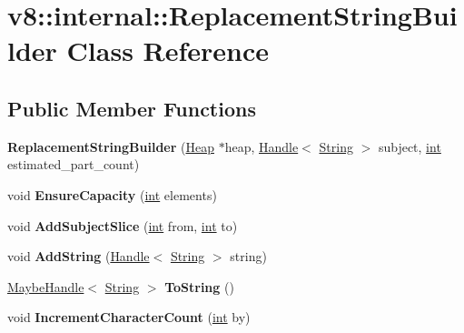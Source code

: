 \hypertarget{classv8_1_1internal_1_1ReplacementStringBuilder}{}\section{v8\+:\+:internal\+:\+:Replacement\+String\+Builder Class Reference}
\label{classv8_1_1internal_1_1ReplacementStringBuilder}
\subsection*{Public Member Functions}
\begin{DoxyCompactItemize}
\item 
\mbox{\label{classv8_1_1internal_1_1ReplacementStringBuilder_aa6ed9782d2325a8fdd46a6e15393eece}} 
{\bfseries Replacement\+String\+Builder} (\mbox{\hyperlink{classv8_1_1internal_1_1Heap}{Heap}} $\ast$heap, \mbox{\hyperlink{classv8_1_1internal_1_1Handle}{Handle}}$<$ \mbox{\hyperlink{classv8_1_1internal_1_1String}{String}} $>$ subject, \mbox{\hyperlink{classint}{int}} estimated\+\_\+part\+\_\+count)
\item 
\mbox{\label{classv8_1_1internal_1_1ReplacementStringBuilder_aa9308f62a984d9fd648403128ed0118f}} 
void {\bfseries Ensure\+Capacity} (\mbox{\hyperlink{classint}{int}} elements)
\item 
\mbox{\label{classv8_1_1internal_1_1ReplacementStringBuilder_ae8334fc56c55ed336a2a1d14b2fab3f5}} 
void {\bfseries Add\+Subject\+Slice} (\mbox{\hyperlink{classint}{int}} from, \mbox{\hyperlink{classint}{int}} to)
\item 
\mbox{\label{classv8_1_1internal_1_1ReplacementStringBuilder_a18e4204c090838012e9cca169c7302b6}} 
void {\bfseries Add\+String} (\mbox{\hyperlink{classv8_1_1internal_1_1Handle}{Handle}}$<$ \mbox{\hyperlink{classv8_1_1internal_1_1String}{String}} $>$ string)
\item 
\mbox{\label{classv8_1_1internal_1_1ReplacementStringBuilder_a3f24ac0bf599fc8de7972e53afa62ad7}} 
\mbox{\hyperlink{classv8_1_1internal_1_1MaybeHandle}{Maybe\+Handle}}$<$ \mbox{\hyperlink{classv8_1_1internal_1_1String}{String}} $>$ {\bfseries To\+String} ()
\item 
\mbox{\label{classv8_1_1internal_1_1ReplacementStringBuilder_ac6b4287222a6e168b84cba200a290910}} 
void {\bfseries Increment\+Character\+Count} (\mbox{\hyperlink{classint}{int}} by)
\end{DoxyCompactItemize}
